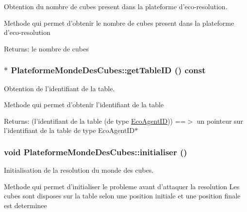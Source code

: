 Obtention du nombre de cubes present dans la plateforme d'eco-resolution. 

Methode qui permet d'obtenir le nombre de cubes present dans la plateforme d'eco-resolution

\begin{Desc}
\item[Returns:]le nombre de cubes \end{Desc}
\hypertarget{classPlateformeMondeDesCubes_232d0a6c6cbd1bc2d8622fa92dd64ce1}{
\subsubsection[{getTableID}]{ $\ast$ PlateformeMondeDesCubes::getTableID () const}}
\label{classPlateformeMondeDesCubes_232d0a6c6cbd1bc2d8622fa92dd64ce1}


Obtention de l'identifiant de la table. 

Methode qui permet d'obtenir l'identifiant de la table

\begin{Desc}
\item[Returns:](l'identifiant de la table (de type \hyperlink{classEcoAgentID}{EcoAgentID})) ==$>$ un pointeur sur l'identifiant de la table de type EcoAgentID$\ast$ \end{Desc}
\hypertarget{classPlateformeMondeDesCubes_67160be6f5ecd0b8f3fffeb1a7bd81ba}{
\subsubsection[{initialiser}]{\setlength{\rightskip}{0pt plus 5cm}void PlateformeMondeDesCubes::initialiser ()}}
\label{classPlateformeMondeDesCubes_67160be6f5ecd0b8f3fffeb1a7bd81ba}


Initialisation de la resolution du monde des cubes. 

Methode qui permet d'initialiser le probleme avant d'attaquer la resolution Les cubes sont disposes sur la table selon une position initiale et une position finale est determinee 

